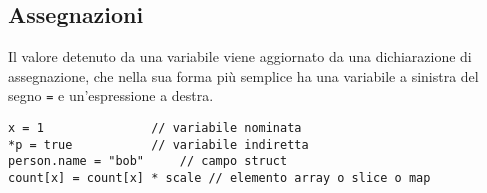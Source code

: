 \documentclass[../../thesis.tex]{subfiles}
\begin{document}
    \subsection{Assegnazioni}\label{subsec:assegnazioni}
    Il valore detenuto da una variabile viene aggiornato da una dichiarazione di assegnazione, che nella sua forma più semplice ha una variabile a sinistra del segno \verb"=" e un'espressione a destra.
    \begin{lstlisting}[frame = single,label={lst:lstlisting1-4.1}]
x = 1			    // variabile nominata
*p = true		    // variabile indiretta
person.name = "bob"	    // campo struct
count[x] = count[x] * scale // elemento array o slice o map
    \end{lstlisting}
    
    
\end{document}
